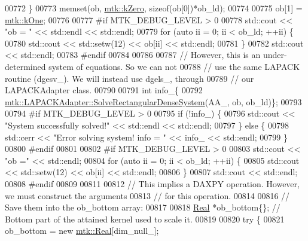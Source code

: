 \begin{DoxyCode}
{{00772     \}
00773     memset(ob, \hyperlink{group__c01-roots_ga59a451a5fae30d59649bcda274fea271}{mtk::kZero}, \textcolor{keyword}{sizeof}(ob[0])*ob\_ld);
00774 
00775     ob[1] = \hyperlink{group__c01-roots_ga26407c24d43b6b95480943340d285c71}{mtk::kOne};
00776 
00777 \textcolor{preprocessor}{    #if MTK\_DEBUG\_LEVEL > 0}
00778     std::cout << \textcolor{stringliteral}{"ob = "} << std::endl << std::endl;
00779     \textcolor{keywordflow}{for} (\textcolor{keyword}{auto} ii = 0; ii < ob\_ld; ++ii) \{
00780       std::cout << std::setw(12) << ob[ii] << std::endl;
00781     \}
00782     std::cout << std::endl;
00783 \textcolor{preprocessor}{    #endif}
00784 
00786 
00787     \textcolor{comment}{// However, this is an under-determined system of equations. So we can not}
00788     \textcolor{comment}{// use the same LAPACK routine (dgesv\_). We will instead use dgels\_, through}
00789     \textcolor{comment}{// our LAPACKAdapter class.}
00790 
00791     \textcolor{keywordtype}{int} info\_\{
00792       \hyperlink{classmtk_1_1LAPACKAdapter_a380f148ffdf96bae2f79ae28f1a6560c}{mtk::LAPACKAdapter::SolveRectangularDenseSystem}(AA\_, 
      ob, ob\_ld)\};
00793 
00794 \textcolor{preprocessor}{    #if MTK\_DEBUG\_LEVEL > 0}
00795     \textcolor{keywordflow}{if} (!info\_) \{
00796       std::cout << \textcolor{stringliteral}{"System successfully solved!"} << std::endl << std::endl;
00797     \} \textcolor{keywordflow}{else} \{
00798       std::cerr << \textcolor{stringliteral}{"Error solving system! info = "} << info\_ << std::endl;
00799     \}
00800 \textcolor{preprocessor}{    #endif}
00801 
00802 \textcolor{preprocessor}{    #if MTK\_DEBUG\_LEVEL > 0}
00803     std::cout << \textcolor{stringliteral}{"ob ="} << std::endl;
00804     \textcolor{keywordflow}{for} (\textcolor{keyword}{auto} ii = 0; ii < ob\_ld; ++ii) \{
00805       std::cout << std::setw(12) << ob[ii] << std::endl;
00806     \}
00807     std::cout << std::endl;
00808 \textcolor{preprocessor}{    #endif}
00809 
00811 
00812     \textcolor{comment}{// This implies a DAXPY operation. However, we must construct the arguments}
00813     \textcolor{comment}{// for this operation.}
00814 
00816     \textcolor{comment}{// Save them into the ob\_bottom array:}
00817 
00818     \hyperlink{group__c01-roots_gac080bbbf5cbb5502c9f00405f894857d}{Real} *ob\_bottom\{\}; \textcolor{comment}{// Bottom part of the attained kernel used to scale it.}
00819 
00820     \textcolor{keywordflow}{try} \{
00821       ob\_bottom = \textcolor{keyword}{new} \hyperlink{group__c01-roots_gac080bbbf5cbb5502c9f00405f894857d}{mtk::Real}[dim\_null\_];
}}
\end{DoxyCode}
